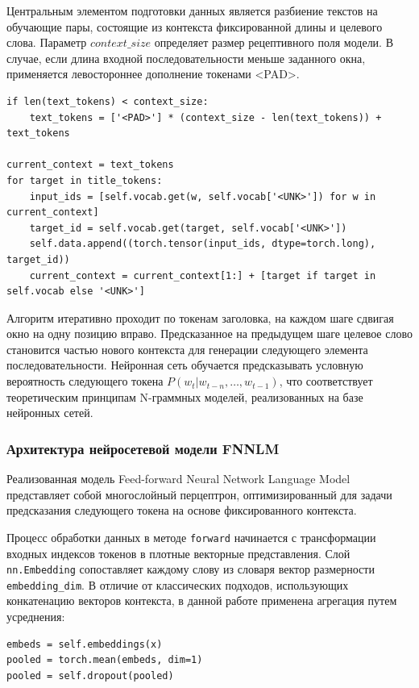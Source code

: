 \documentclass[coursework]{SCWorks}
\begin{document}
    Центральным элементом подготовки данных является разбиение текстов на обучающие пары,
    состоящие из контекста фиксированной длины и целевого слова.
    Параметр $context\_size$ определяет размер рецептивного поля модели.
    В случае, если длина входной последовательности меньше заданного окна,
    применяется левостороннее дополнение токенами <PAD>.
    \begin{verbatim}
if len(text_tokens) < context_size:
    text_tokens = ['<PAD>'] * (context_size - len(text_tokens)) + text_tokens

current_context = text_tokens
for target in title_tokens:
    input_ids = [self.vocab.get(w, self.vocab['<UNK>']) for w in current_context]
    target_id = self.vocab.get(target, self.vocab['<UNK>'])
    self.data.append((torch.tensor(input_ids, dtype=torch.long), target_id))
    current_context = current_context[1:] + [target if target in self.vocab else '<UNK>']
    \end{verbatim}


    Алгоритм итеративно проходит по токенам заголовка, на каждом шаге сдвигая окно на одну позицию вправо.
    Предсказанное на предыдущем шаге целевое слово становится частью нового контекста для генерации
    следующего элемента последовательности.
    Нейронная сеть обучается предсказывать условную вероятность следующего токена
    $P(w_t | w_{t-n}, \dots, w_{t-1})$, что соответствует теоретическим принципам N-граммных моделей,
    реализованных на базе нейронных сетей.

    \subsubsection{Архитектура нейросетевой модели FNNLM}

    Реализованная модель Feed-forward Neural Network Language Model представляет собой многослойный перцептрон, оптимизированный для задачи предсказания следующего токена на основе фиксированного контекста.

    Процесс обработки данных в методе \texttt{forward} начинается с трансформации входных индексов токенов в плотные векторные представления. Слой \texttt{nn.Embedding} сопоставляет каждому слову из словаря вектор размерности \texttt{embedding\_dim}. В отличие от классических подходов, использующих конкатенацию векторов контекста, в данной работе применена агрегация путем усреднения:

    \begin{verbatim}
embeds = self.embeddings(x)
pooled = torch.mean(embeds, dim=1)
pooled = self.dropout(pooled)
    \end{verbatim}
\end{document}
